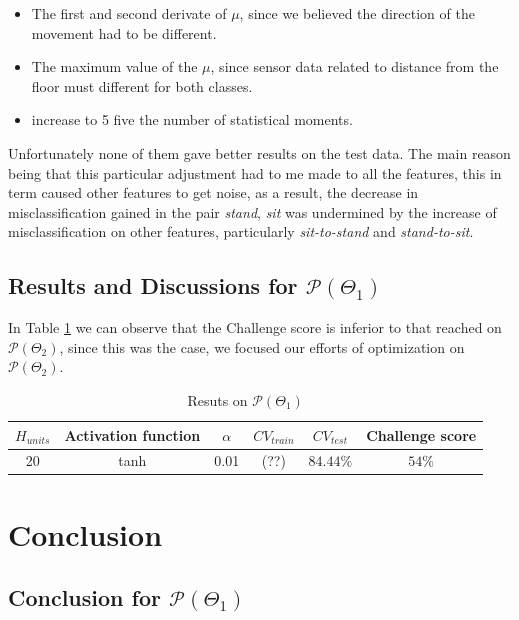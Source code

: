 \begin{itemize}
	\item The first and second derivate of $\mu$, since we believed the direction of the movement had to be different.
	\item The maximum value of the $\mu$, since sensor data related to distance from the floor must different for both classes.
	\item increase to 5 five the number of statistical moments.
\end{itemize}

Unfortunately none of them gave better results on the test data. The main reason being that this particular adjustment had to me made to all the features, this in term caused other features to get noise, as a result, the decrease in misclassification gained in the pair  \emph{stand}, \emph{sit} was undermined by the increase of misclassification on other features, particularly \emph{sit-to-stand} and \emph{stand-to-sit}.

\subsection{Results and Discussions for  $\mathcal{P}(\Theta_{1})$}

In Table \ref{table:p1_result} we can observe that the Challenge score is inferior to that reached on $\mathcal{P}(\Theta_{2})$, since this was the case, we focused our efforts of optimization on $\mathcal{P}(\Theta_{2})$.

\begin{table}[h!]
	\begin{center}
		\begin{tabular}{||c c c c c c||}
			\hline
			$H_{units}$ &Activation function & $\alpha$ & $CV_{train}$ & $CV_{test}$  & Challenge score \\ [0.5ex]
			\hline
			20 & tanh &0.01& (??) & $84.44\%$& $54\%$  \\
			\hline
		\end{tabular}
		\caption{Resuts on $\mathcal{P}(\Theta_{1})$}
		\label{table:p1_result}
	\end{center}
\end{table}

\section{Conclusion}

\subsection{Conclusion for $\mathcal{P}(\Theta_{1})$}


